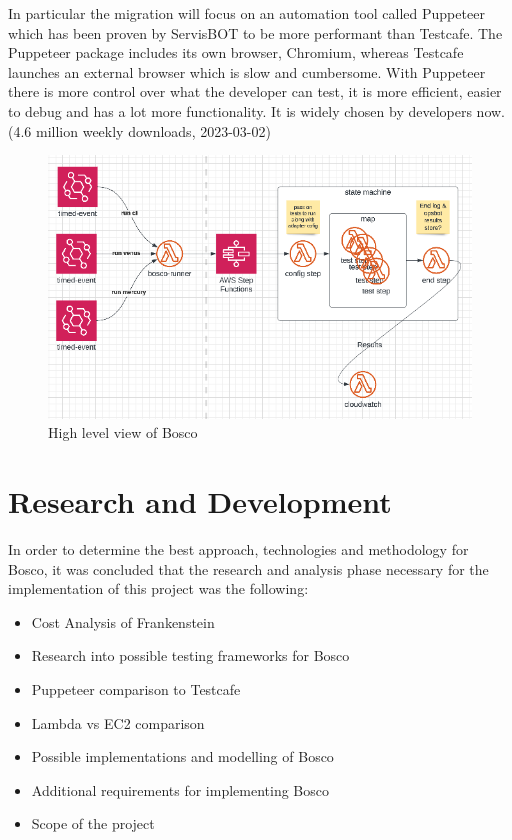 \documentclass[12pt,a4paper,titlepage]{report}
\begin{document}
In particular the migration will focus on an automation tool called Puppeteer which has been proven by ServisBOT to be more performant than Testcafe. The Puppeteer package includes its own browser, Chromium, whereas Testcafe launches an external browser which is slow and cumbersome. With Puppeteer there is more control over what the developer can test, it is more efficient, easier to debug and has a lot more functionality. It is widely chosen by developers now. (4.6 million weekly downloads, 2023-03-02) \cite{Puppeteer}

\begin{figure}[ht]
 \centering
 \includegraphics[width=\textwidth,height=\textheight,keepaspectratio]{./diagrams/bosco_high_level.png}
 \caption{High level view of Bosco}
\end{figure}

\chapter{Research and Development}

In order to determine the best approach, technologies and methodology for Bosco, it was concluded that the research and analysis phase necessary for the implementation of this project was the following:

\begin{itemize}
 \item Cost Analysis of Frankenstein
 \item Research into possible testing frameworks for Bosco
 \item Puppeteer comparison to Testcafe
 \item Lambda vs EC2 comparison
 \item Possible implementations and modelling of Bosco
 \item Additional requirements for implementing Bosco
 \item Scope of the project
\end{itemize}
\end{document}
